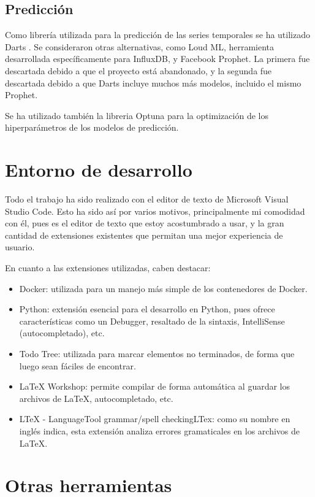 \subsection{Predicción}

Como librería utilizada para la predicción de las series temporales se ha utilizado Darts \cite{JMLR:v23:21-1177}.
Se consideraron otras alternativas, como Loud ML, herramienta desarrollada específicamente para InfluxDB, y 
Facebook Prophet. La primera fue descartada debido a que el proyecto está abandonado, y la segunda fue descartada 
debido a que Darts incluye muchos más modelos, incluido el mismo Prophet.

Se ha utilizado también la libreria Optuna para la optimización de los hiperparámetros de los modelos de predicción.

\section{Entorno de desarrollo}

Todo el trabajo ha sido realizado con el editor de texto de Microsoft Visual Studio Code. Esto ha sido así por 
varios motivos, principalmente mi comodidad con él, pues es el editor de texto que estoy acostumbrado a usar, y 
la gran cantidad de extensiones existentes que permitan una mejor experiencia de usuario.

En cuanto a las extensiones utilizadas, caben destacar:
\begin{itemize}
    \item Docker: utilizada para un manejo más simple de los contenedores de Docker.
    \item Python: extensión esencial para el desarrollo en Python, pues ofrece características como un Debugger, 
        resaltado de la sintaxis, IntelliSense (autocompletado), etc.
    \item Todo Tree: utilizada para marcar elementos no terminados, de forma que luego sean fáciles de encontrar.
    \item LaTeX Workshop: permite compilar de forma automática al guardar los archivos de LaTeX, autocompletado, etc.
    \item LTeX - LanguageTool grammar/spell checkingLTex: como su nombre en inglés indica, esta extensión analiza 
        errores gramaticales en los archivos de LaTeX.
\end{itemize}


\section{Otras herramientas}


